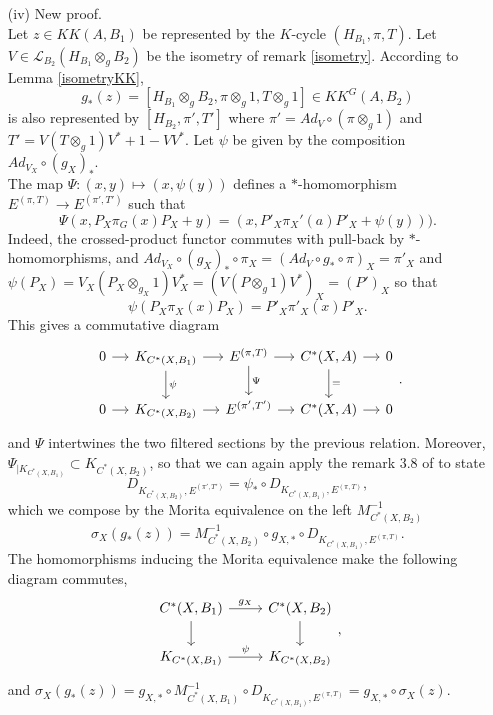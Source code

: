 \begin{dem}
\begin{enumerate}

\item[(iv)] New proof.\\
Let $z \in KK(A,B_1)$ be represented by the $K$-cycle $(H_{B_1},\pi,T)$. Let $V\in \mathcal L_{B_2}(H_{B_1}\otimes_g B_2)$ be the isometry of remark \ref{isometry}. According to Lemma \ref{isometryKK}, 
\[g_*(z)=[H_{B_1}\otimes_g B_2, \pi\otimes_g 1, T\otimes_g 1]\in KK^G(A,B_2)\] 
is also represented by $[H_{B_2}, \pi',T' ]$ where $\pi' = Ad_{V}\circ (\pi\otimes_g 1)$ and $T' = V(T\otimes_g 1)V^* +1-VV^*$. Let $\psi$ be given by the composition $Ad_{V_X}\circ (g_X)_*$.\\
The map $\Psi :(x,y)\mapsto (x, \psi(y))$ defines a $*$-homomorphism $E^{(\pi,T)} \rightarrow E^{(\pi',T')}$ such that 
\[\Psi(x,P_X\pi_G(x)P_X +y)= (x, P'_X  \pi_X'(a)P'_X + \psi(y)) ).\] 
Indeed, the crossed-product functor commutes with pull-back by $*$-homomorphisms, and $Ad_{V_X}\circ(g_X)_*\circ\pi_X= (Ad_V\circ g_* \circ \pi)_X = \pi'_X$ and $\psi(P_X)= V_X (P_X\otimes_{g_X} 1)V^*_X = (V(P\otimes_g 1 ) V^*)_X = (P')_X$ so that 
\[\psi(P_X \pi_X(x) P_X)=P'_X \pi'_X(x) P'_X. \]
This gives a commutative diagram 
\[\begin{tikzcd}[column sep = small]
0\arrow{r} & K_{C^*(X,B_1)}\arrow{r}\arrow{d}{\psi} & E^{(\pi,T)} \arrow{r}\arrow{d}{\Psi}& C^*(X,A)\arrow{r}\arrow{d}{=} & 0\\
0\arrow{r} & K_{C^*(X,B_2)}\arrow{r} & E^{(\pi',T')} \arrow{r}& C^*(X,A)\arrow{r} & 0
\end{tikzcd}.\]
and $\Psi$ intertwines the two filtered sections by the previous relation. Moreover, $\Psi_{|K_{C^*(X,B_1)}}\subset K_{C^*(X,B_2)}$, so that we can again apply the remark $3.8$ of \cite{OY2} to state
\[ D_{K_{C^*(X,B_2)},E^{(\pi',T')}}=\psi_*\circ D_{K_{C^*(X,B_1)},E^{(\pi,T)}},\]
which we compose by the Morita equivalence on the left $M_{C^*(X,B_2)}^{-1}$
\[\sigma_X(g_*(z)) = M_{C^*(X,B_2)}^{-1}\circ g_{X,*}\circ D_{K_{C^*(X,B_1)},E^{(\pi,T)}}.\]
The homomorphisms inducing the Morita equivalence make the following diagram commutes,
\[\begin{tikzcd}C^*(X,B_1)\arrow{r}{g_X}\arrow{d} & C^*(X,B_2)\arrow{d} \\ K_{C^*(X,B_1) } \arrow{r}{\psi}& K_{C^*(X,B_2)}\end{tikzcd},\]
and $\sigma_X(g_*(z))= g_{X,*}\circ M_{C^*(X,B_1)}^{-1}\circ D_{K_{C^*(X,B_1)},E^{(\pi,T)}}=g_{X,*}\circ \sigma_X(z)$.\\


\end{enumerate}
\end{dem}
